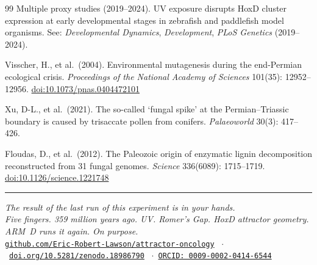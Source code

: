 \documentclass[11pt, a4paper]{article}
\begin{document}
\begin{thebibliography}{99}
Multiple proxy studies (2019--2024).
UV exposure disrupts HoxD cluster expression
at early developmental stages in zebrafish
and paddlefish model organisms.
See: \textit{Developmental Dynamics},
\textit{Development},
\textit{PLoS Genetics} (2019--2024).

Visscher, H., et al.\ (2004).
Environmental mutagenesis during the
end-Permian ecological crisis.
\textit{Proceedings of the National Academy
of Sciences} 101(35): 12952--12956.
\href{https://doi.org/10.1073/pnas.0404472101}
{doi:10.1073/pnas.0404472101}

Xu, D-L., et al.\ (2021).
The so-called `fungal spike' at the
Permian--Triassic boundary is caused by
trisaccate pollen from conifers.
\textit{Palaeoworld} 30(3): 417--426.

Floudas, D., et al.\ (2012).
The Paleozoic origin of enzymatic lignin
decomposition reconstructed from 31 fungal
genomes.
\textit{Science} 336(6089): 1715--1719.
\href{https://doi.org/10.1126/science.1221748}
{doi:10.1126/science.1221748}

\end{thebibliography}

\vspace{1em}
\noindent\textcolor{rulecolor}{\rule{\linewidth}{0.6pt}}

\begin{center}
\footnotesize
\textit{The result of the last run of this
experiment is in your hands.\\
Five fingers. 359 million years ago.
UV. Romer's Gap. HoxD attractor geometry.\\
ARM~D runs it again. On purpose.}\\[0.5em]
\href{https://github.com/Eric-Robert-Lawson/attractor-oncology}
{\texttt{github.com/Eric-Robert-Lawson/attractor-oncology}}
\ $\cdot$\
\href{https://doi.org/10.5281/zenodo.18986790}
{\texttt{doi.org/10.5281/zenodo.18986790}}
\ $\cdot$\
\href{https://orcid.org/0009-0002-0414-6544}
{\texttt{ORCID: 0009-0002-0414-6544}}
\end{center}
\end{document}
